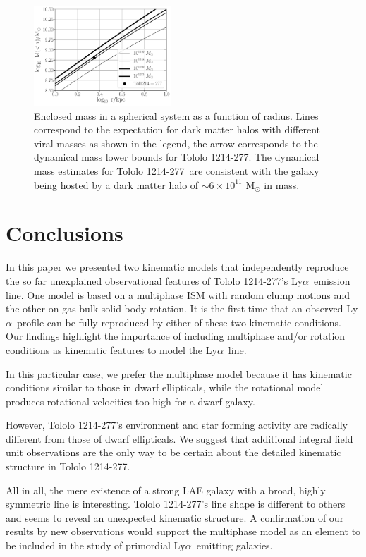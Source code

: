 \documentclass[a4paper,fleqn,usenatbib]{mnras}
\newcommand{\tol}{Tololo 1214-277}
\newcommand{\lya}{\ifmmode{{\rm Ly}\alpha}\else Ly$\alpha$\ \fi}
\begin{document}
\begin{figure}
\begin{center}
\includegraphics[width=0.46\textwidth]{enclosed_mass.pdf}
\caption{Enclosed mass in a spherical system as a function of radius.
  Lines correspond to the expectation for dark matter halos with
  different viral masses as shown in the legend, the arrow corresponds
  to the dynamical mass lower bounds for \tol.  
  The dynamical mass estimates for \tol\ are consistent with the
  galaxy being hosted by a dark matter halo of
  $\sim 6\times10^{11}$ M$_{\odot}$ in mass.
    \label{fig:mass}} 
\end{center}
\end{figure}


\section{Conclusions}
\label{sec:conclusions}

In this paper we presented two kinematic models that independently
reproduce the so far unexplained observational features of \tol's
\lya emission line.
One model is based on a multiphase ISM with random clump motions and
the other on gas bulk solid body rotation. 
It is the first time that an observed \lya profile can be fully
reproduced by either of these two kinematic conditions.
Our findings highlight the importance of including multiphase and/or
rotation conditions as kinematic features to model the \lya line.

In this particular case, we prefer the multiphase model because it has kinematic
conditions similar to those in dwarf ellipticals, while the
rotational model produces rotational velocities too high for a dwarf
galaxy.  

However, \tol's environment and star forming activity are radically
different from those of dwarf ellipticals.
We suggest that additional integral field unit observations are the
only way to be certain about the detailed kinematic structure in \tol.

All in all, the mere existence of a strong LAE galaxy with a broad,
highly symmetric line is interesting. 
\tol's line shape is different to others and seems to reveal an
unexpected kinematic structure.
A confirmation of our results by new observations would support the multiphase model
as an element to be included in the study of primordial \lya emitting
galaxies.
 
\end{document}
